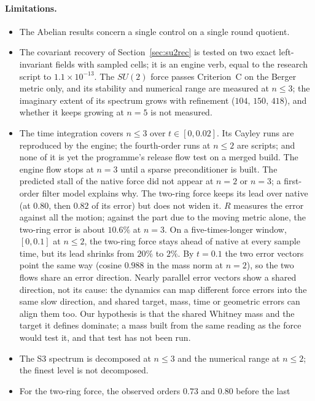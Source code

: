 \documentclass[11pt]{article}
\theoremstyle{definition}
\theoremstyle{remark}
\newcommand{\BW}{Criterion~C}
\begin{document}
\paragraph{Limitations.}
\begin{itemize}
  \item The Abelian results concern a single control on a single round quotient.
  \item The covariant recovery of Section~\ref{sec:su2rec} is tested on two exact left-invariant
    fields with sampled cells; it is an engine verb, equal to the research script to
    $1.1\times10^{-13}$. The $SU(2)$ force passes \BW{} on
    the Berger metric only, and its stability and numerical range are measured at $n\le3$;
    the imaginary extent of its spectrum grows with refinement ($104$, $150$, $418$), and
    whether it keeps growing at $n=5$ is not measured.
  \item The time integration covers $n\le3$ over $t\in[0,0.02]$. Its Cayley runs are reproduced
    by the engine; the fourth-order runs at $n\le2$ are scripts; and none of it is yet the
    programme's release flow test on a merged build. The engine flow stops at $n=3$ until a sparse
    preconditioner is built. The predicted stall of the native force did not appear at $n=2$ or
    $n=3$; a first-order filter model explains why. The two-ring force keeps its lead over
    native (at $0.80$, then $0.82$ of its error) but does not widen it. $R$ measures the error
    against all the motion; against the part due to the moving metric alone, the two-ring
    error is about $10.6\%$ at $n=3$. On a five-times-longer window, $[0,0.1]$ at $n\le2$, the
    two-ring force stays ahead of native at every sample time, but its lead shrinks from
    $20\%$ to $2\%$. By $t=0.1$ the two error vectors point the same way (cosine $0.988$ in the
    mass norm at $n=2$), so the two flows share an error direction. Nearly parallel
    error vectors show a shared direction, not its cause: the dynamics can map different force
    errors into the same slow direction, and shared target, mass, time or geometric errors can align
    them too. Our hypothesis is that the shared Whitney mass and the target it defines dominate; a
    mass built from the same reading as the force would test it, and that test has not been run.
  \item The S3 spectrum is decomposed at $n\le 3$ and the numerical range at $n\le 2$;
    the finest level is not decomposed.
  \item For the two-ring force, the observed orders $0.73$ and $0.80$ before the last

\end{itemize}
\end{document}
